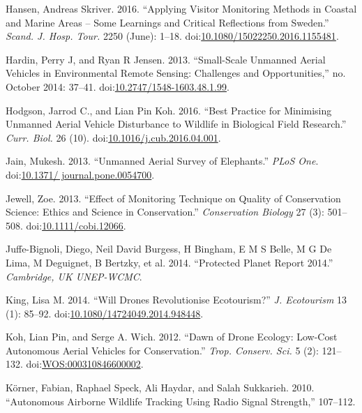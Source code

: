 \documentclass[]{interact}
\theoremstyle{plain}%
\theoremstyle{definition}
\theoremstyle{remark}
\begin{document}
\hypertarget{ref-hansen_applying_2016}{}
Hansen, Andreas Skriver. 2016. ``Applying Visitor Monitoring Methods in
Coastal and Marine Areas -- Some Learnings and Critical Reflections from
Sweden.'' \emph{Scand. J. Hosp. Tour.} 2250 (June): 1--18.
doi:\href{https://doi.org/10.1080/15022250.2016.1155481}{10.1080/15022250.2016.1155481}.

\hypertarget{ref-hardin_small-scale_2013}{}
Hardin, Perry J, and Ryan R Jensen. 2013. ``Small-Scale Unmanned Aerial
Vehicles in Environmental Remote Sensing: Challenges and
Opportunities,'' no. October 2014: 37--41.
doi:\href{https://doi.org/10.2747/1548-1603.48.1.99}{10.2747/1548-1603.48.1.99}.

\hypertarget{ref-hodgson_best_2016}{}
Hodgson, Jarrod C., and Lian Pin Koh. 2016. ``Best Practice for
Minimising Unmanned Aerial Vehicle Disturbance to Wildlife in Biological
Field Research.'' \emph{Curr. Biol.} 26 (10).
doi:\href{https://doi.org/10.1016/j.cub.2016.04.001}{10.1016/j.cub.2016.04.001}.

\hypertarget{ref-jain_unmanned_2013}{}
Jain, Mukesh. 2013. ``Unmanned Aerial Survey of Elephants.'' \emph{PLoS
One}.
doi:\href{https://doi.org/10.1371/\%20journal.pone.0054700}{10.1371/ journal.pone.0054700}.

\hypertarget{ref-jewell_effect_2013}{}
Jewell, Zoe. 2013. ``Effect of Monitoring Technique on Quality of
Conservation Science: Ethics and Science in Conservation.''
\emph{Conservation Biology} 27 (3): 501--508.
doi:\href{https://doi.org/10.1111/cobi.12066}{10.1111/cobi.12066}.

\hypertarget{ref-juffe-bignoli_protected_2014}{}
Juffe-Bignoli, Diego, Neil David Burgess, H Bingham, E M S Belle, M G De
Lima, M Deguignet, B Bertzky, et al. 2014. ``Protected Planet Report
2014.'' \emph{Cambridge, UK UNEP-WCMC}.

\hypertarget{ref-king_will_2014}{}
King, Lisa M. 2014. ``Will Drones Revolutionise Ecotourism?'' \emph{J.
Ecotourism} 13 (1): 85--92.
doi:\href{https://doi.org/10.1080/14724049.2014.948448}{10.1080/14724049.2014.948448}.

\hypertarget{ref-koh_dawn_2012}{}
Koh, Lian Pin, and Serge A. Wich. 2012. ``Dawn of Drone Ecology:
Low-Cost Autonomous Aerial Vehicles for Conservation.'' \emph{Trop.
Conserv. Sci.} 5 (2): 121--132.
doi:\href{https://doi.org/WOS:000310846600002}{WOS:000310846600002}.

\hypertarget{ref-korner_autonomous_2010}{}
Körner, Fabian, Raphael Speck, Ali Haydar, and Salah Sukkarieh. 2010.
``Autonomous Airborne Wildlife Tracking Using Radio Signal Strength,''
107--112.
\end{document}
